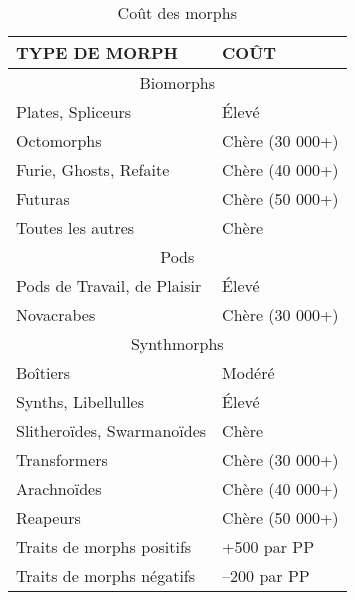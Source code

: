 \begin{table} \caption{Coût des morphs} \begin{tabular}{|l|l|} \hline

TYPE DE MORPH &COÛT \\ \hline

\multicolumn{2}{|c|}{Biomorphs} \\ \hline

Plates, Spliceurs &Élevé \\ \hline

Octomorphs &Chère (30 000+) \\ \hline

Furie, Ghosts, Refaite &Chère (40 000+) \\ \hline

Futuras &Chère (50 000+) \\ \hline

Toutes les autres &Chère \\ \hline

\multicolumn{2}{|c|}{Pods} \\ \hline

Pods de Travail, de Plaisir &Élevé \\ \hline

Novacrabes &Chère (30 000+) \\ \hline

\multicolumn{2}{|c|}{Synthmorphs} \\ \hline

Boîtiers &Modéré \\ \hline

Synths, Libellulles &Élevé \\ \hline

Slitheroïdes, Swarmanoïdes &Chère \\ \hline

Transformers &Chère (30 000+) \\ \hline

Arachnoïdes &Chère (40 000+) \\ \hline

Reapeurs &Chère (50 000+) \\ \hline

Traits de morphs positifs &+500 par PP \\ \hline

Traits de morphs négatifs &–200 par PP \\ \hline

\end{tabular} \label{table:morph-costs} \end{table} 



